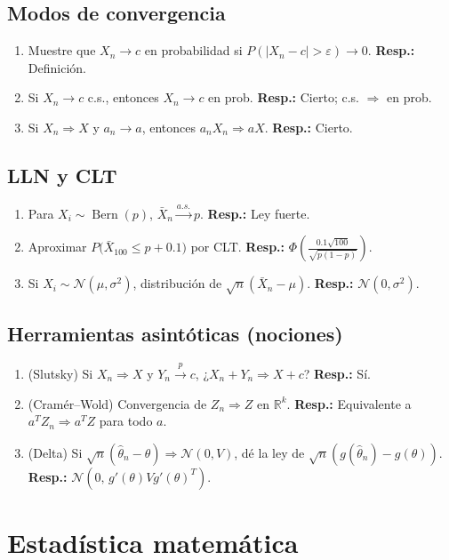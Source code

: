 	\subsection*{Modos de convergencia}
	\begin{enumerate}
		\item Muestre que $X_n\to c$ en probabilidad si $P(|X_n-c|>\varepsilon)\to0$. \textbf{Resp.:} Definición.
		\item Si $X_n\to c$ c.s., entonces $X_n\to c$ en prob. \textbf{Resp.:} Cierto; c.s. $\Rightarrow$ en prob.
		\item Si $X_n\Rightarrow X$ y $a_n\to a$, entonces $a_nX_n\Rightarrow aX$. \textbf{Resp.:} Cierto.
	\end{enumerate}
	
	\subsection*{LLN y CLT}
	\begin{enumerate}
		\item Para $X_i\sim\operatorname{Bern}(p)$, $\bar X_n\xrightarrow{a.s.}p$. \textbf{Resp.:} Ley fuerte.
		\item Aproximar $P\big(\bar X_{100}\le p+0.1\big)$ por CLT. \textbf{Resp.:} $\Phi\!\left( \frac{0.1\sqrt{100}}{\sqrt{p(1-p)}} \right)$.
		\item Si $X_i\sim\mathcal N(\mu,\sigma^2)$, distribución de $\sqrt{n}(\bar X_n-\mu)$. \textbf{Resp.:} $\mathcal N(0,\sigma^2)$.
	\end{enumerate}
	
	\subsection*{Herramientas asintóticas (nociones)}
	\begin{enumerate}
		\item (Slutsky) Si $X_n\Rightarrow X$ y $Y_n\xrightarrow{p}c$, ¿$X_n+Y_n\Rightarrow X+c$? \textbf{Resp.:} Sí.
		\item (Cramér--Wold) Convergencia de $Z_n\Rightarrow Z$ en $\mathbb R^k$. \textbf{Resp.:} Equivalente a $a^TZ_n\Rightarrow a^TZ$ para todo $a$.
		\item (Delta) Si $\sqrt n(\hat\theta_n-\theta)\Rightarrow \mathcal N(0,V)$, dé la ley de $\sqrt n(g(\hat\theta_n)-g(\theta))$. \textbf{Resp.:} $\mathcal N(0,\,g'(\theta)Vg'(\theta)^T)$.
	\end{enumerate}
	
	\section{Estadística matemática}
